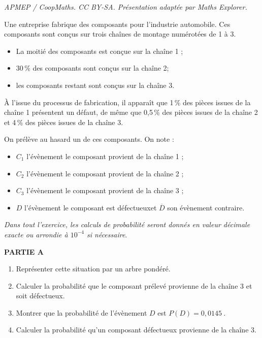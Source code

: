 \documentclass[10pt]{article}
\providecommand{\np}[2][]{{#2~#1}}
\providecommand{\no}{{\text{n°}}}
\begin{document}
\noindent\textit{APMEP / CoopMaths. CC BY-SA. Présentation adaptée par Maths Explorer.}\par\medskip
\medskip

Une entreprise fabrique des composants pour l'industrie automobile. Ces composants sont conçus sur trois chaînes de montage numérotées de 1 à 3.
\begin{itemize}
\item[$\bullet~~$] La moitié des composants est conçue sur la chaîne \no 1 ;
\item[$\bullet~~$]  30\,\% des composants sont conçus sur la chaîne \no 2;
\item[$\bullet~~$]  les composants restant sont conçus sur la chaîne \no 3.
\end{itemize}

À l'issue du processus de fabrication, il apparaît que 1\,\% des pièces issues de la chaîne \no 1 présentent un défaut, de même que 0,5\,\% des pièces issues de la chaîne \no 2 et 4\,\% des pièces issues de la chaîne \no 3.

On prélève au hasard un de ces composants. On note :

\begin{itemize}
\item[$\bullet~~$] $C_1$ l'évènement \og le composant provient de la chaîne \no 1 \fg{} ;
\item[$\bullet~~$] $C_2$ l'évènement \og le composant provient de la chaîne \no 2 \fg{} ;
\item[$\bullet~~$] $C_3$ l'évènement \og le composant provient de la chaîne \no 3 \fg{} ;
\item[$\bullet~~$] $D$ l'évènement \og le composant est défectueux\fg et $\overline{D}$ son évènement contraire.
\end{itemize}

\emph{Dans tout l'exercice, les calculs de probabilité seront donnés en valeur décimale exacte ou arrondie à $10^{-4}$ si nécessaire}.

\medskip

\textbf{PARTIE A}

\medskip

\begin{enumerate}
\item Représenter cette situation par un arbre pondéré.
\item Calculer la probabilité que le composant prélevé provienne de la chaîne \no 3 et soit
défectueux.
\item Montrer que la probabilité de l'évènement $D$ est $P(D) = \np{0,0145}$.
\item Calculer la probabilité qu'un composant défectueux provienne de la chaîne \no 3.
\end{enumerate}
\end{document}
